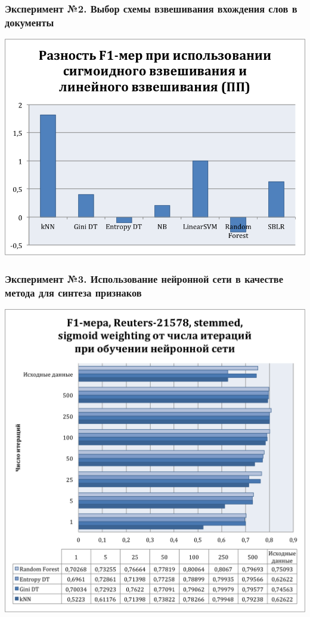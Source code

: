 \documentclass{beamer}
\begin{document}
\begin{frame}
\frametitle{Эксперимент №2. Выбор схемы взвешивания вхождения слов в документы}
\begin{center}
    \includegraphics[width=\linewidth,height=0.7\textheight,align=\center,trim=4 4 4 4, clip, keepaspectratio]{lin-sigm-diff.png}
\end{center}
\end{frame}

\begin{frame}
\frametitle{Эксперимент №3. Использование нейронной сети в качестве метода для синтеза признаков}
\begin{center}
    \includegraphics[width=\linewidth,height=0.7\textheight,align=\center,trim=4 4 4 4, clip, keepaspectratio]{neural-reuters.png}
\end{center}
\end{frame}
\end{document}
